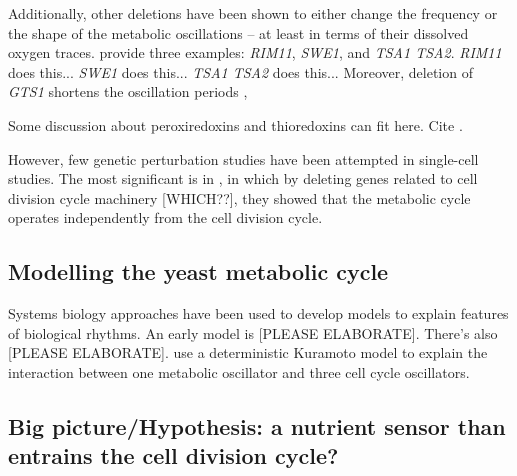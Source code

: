 Additionally, other deletions have been shown to either change the frequency or the shape of the metabolic oscillations -- at least in terms of their dissolved oxygen traces.
\textcite{caustonMetabolicCyclesYeast2015} provide three examples: \emph{RIM11}, \emph{SWE1}, and \emph{TSA1 TSA2}. %
\emph{RIM11} does this...
\emph{SWE1} does this...
\emph{TSA1 TSA2} does this...
Moreover, deletion of \emph{GTS1} shortens the oscillation periods \citep{lloydUltradianMetronomeTimekeeper2005},

Some discussion about peroxiredoxins and thioredoxins can fit here.
Cite \textcite{amponsahPeroxiredoxinsCoupleMetabolism2021}.

However, few genetic perturbation studies have been attempted in single-cell studies.
The most significant is in \textcite{baumgartnerFlavinbasedMetabolicCycles2018}, in which by deleting genes related to cell division cycle machinery [WHICH??], they showed that the metabolic cycle operates independently from the cell division cycle.

\subsection{Modelling the yeast metabolic cycle}
\label{subsec:intro-ymc-model}

Systems biology approaches have been used to develop models to explain features of biological rhythms.
An early model is \parencite{jonesCyberneticModelGrowth1999} [PLEASE ELABORATE].
There's also \textcite{krishnaMinimalPushPull2018} [PLEASE ELABORATE].
\citet{ozsezenInferenceHighLevelInteraction2019} use a deterministic Kuramoto model to explain the interaction between one metabolic oscillator and three cell cycle oscillators.

\subsection{Big picture/Hypothesis: a nutrient sensor than entrains the cell division cycle?}
\label{subsec:intro-ymc-hypothesis}

